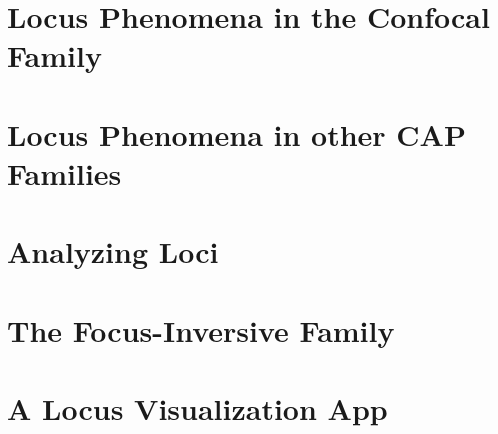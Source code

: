 \documentclass{book}
\begin{document}
\chapter[Confocal Loci]{Locus Phenomena in the Confocal Family}
\label{chap:05-confocal-loci}


\chapter[Loci in CAP Pairs]{Locus Phenomena in other CAP Families}
\label{chap:06-cap-loci}
%

\chapter{Analyzing Loci}
\label{chap:07-n3-loci}


\chapter{The Focus-Inversive Family}
\label{chap:08-focus-inversive}


\chapter{A Locus Visualization App}
\label{chap:09-experimental}



 
%

%
\end{document}
